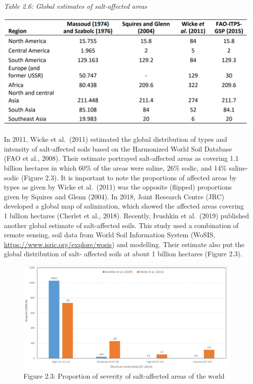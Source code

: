 \documentclass[
  10pt,
  b5paper,
]{book}
\begin{document}
\emph{Table 2.6: Global estimates of salt-affected areas}

\includegraphics{figures/tables/Table_2.6.PNG}

In 2011, Wicke et al.~(2011) estimated the global distribution of types and intensity of salt-affected soils based on the Harmonized World Soil Database (FAO et al., 2008). Their estimate portrayed salt-affected areas as covering 1.1 billion hectares in which 60\% of the areas were saline, 26\% sodic, and 14\% saline- sodic (Figure 2.3). It is important to note the proportions of affected areas by types as given by Wicke et al.~(2011) was the opposite (flipped) proportions given by Squires and Glenn (2004). In 2018, Joint Research Centre (JRC) developed a global map of salinization, which showed the affected areas covering 1 billion hectares (Cherlet et al., 2018).
Recently, Ivushkin et al.~(2019) published another global estimate of salt-affected soils. This study used a combination of remote sensing, soil data from World Soil Information System (WoSIS, \url{https://www.isric.org/explore/wosis}) and modelling. Their estimate also put the global distribution of salt- affected soils at about 1 billion hectares (Figure 2.3).

\begin{figure}
\centering
\includegraphics{figures/images/Figure2.3.jpg}
\caption{Figure 2.3: Proportion of severity of salt-affected areas of the world}
\end{figure}
\end{document}
